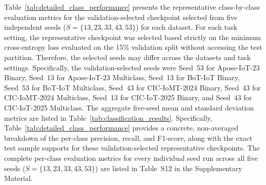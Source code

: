 \documentclass[a4paper,fleqn]{cas-sc}
\begin{document}
{\color{blue}Table~\ref{tab:detailed_class_performance} presents the representative class-by-class evaluation metrics for the validation-selected checkpoint selected from five independent seeds ($S=\{13, 23, 33, 43, 53\}$) for each dataset. For each task setting, the representative checkpoint was selected based strictly on the minimum cross-entropy loss evaluated on the 15\% validation split without accessing the test partition. Therefore, the selected seeds may differ across the datasets and task settings. Specifically, the validation-selected seeds were Seed~53 for Apose-IoT-23 Binary, Seed~13 for Apose-IoT-23 Multiclass, Seed~13 for BoT-IoT Binary, Seed~53 for BoT-IoT Multiclass, Seed~43 for CIC-IoMT-2024 Binary, Seed~43 for CIC-IoMT-2024 Multiclass, Seed~13 for CIC-IoT-2025 Binary, and Seed~43 for CIC-IoT-2025 Multiclass. The aggregate five-seed mean and standard deviation metrics are listed in Table~\ref{tab:classification_results}. Specifically, Table~\ref{tab:detailed_class_performance} provides a concrete, non-averaged breakdown of the per-class precision, recall, and F1-score, along with the exact test sample supports for these validation-selected representative checkpoints. The complete per-class evaluation metrics for every individual seed run across all five seeds ($S=\{13, 23, 33, 43, 53\}$) are listed in Table~S12 in the Supplementary Material.}
\end{document}
